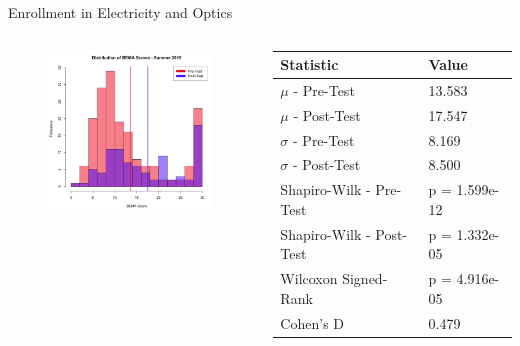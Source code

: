 \documentclass{beamer}
\begin{document}
\begin{frame}{Enrollment in Electricity and Optics}
\begin{columns}
\begin{column}{2in}
\begin{figure}
	\includegraphics[width=2in]{img/chapter4/bema_summer_2015}
\end{figure}
\end{column}
\begin{column}{2in}
\begin{scriptsize}
\begin{table}
  \centering
  \begin{tabular}{|l|l|}
    \hline
    \textbf{Statistic} & \textbf{Value} \\
	\hline
	$\mu$ - Pre-Test & 13.583 \\
	\hline
	$\mu$ - Post-Test & 17.547 \\
	\hline
	$\sigma$ - Pre-Test & 8.169 \\
	\hline
	$\sigma$ - Post-Test & 8.500 \\
	\hline
	Shapiro-Wilk - Pre-Test & p = 1.599e-12 \\
	\hline
	Shapiro-Wilk - Post-Test & p = 1.332e-05 \\
	\hline
	Wilcoxon Signed-Rank & p = 4.916e-05 \\
	\hline
	Cohen's D & 0.479 \\
	\hline
  \end{tabular}
\end{table}
\end{scriptsize}
\end{column}
\end{columns}
\end{frame}
\end{document}

